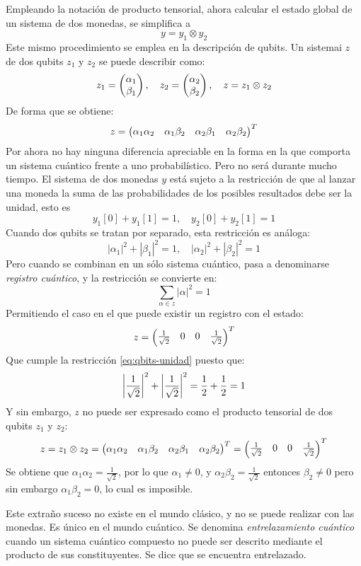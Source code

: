 Empleando la notación de producto tensorial, ahora calcular el estado global de 
un sistema de dos monedas, se simplifica a
%
$$ y = y_1 \otimes y_2 $$
%
Este mismo procedimiento se emplea en la descripción de qubits. Un sistemai $z$ 
de dos qubits $z_1$ y $z_2$ se puede describir como:
%
$$
z_1 = \begin{pmatrix} \alpha_1 \\ \beta_1 \end{pmatrix}, \quad
z_2 = \begin{pmatrix} \alpha_2 \\ \beta_2 \end{pmatrix}, \quad
z = z_1 \otimes z_2 $$
%
De forma que se obtiene:
%
$$
z = \begin{pmatrix} \alpha_1 \alpha_2 & \alpha_1 \beta_2
	& \alpha_2 \beta_1 & \alpha_2 \beta_2 \end{pmatrix}^T $$
%
Por ahora no hay ninguna diferencia apreciable en la forma en la que comporta un 
sistema cuántico frente a uno probabilístico. Pero no será durante mucho tiempo.
El sistema de dos monedas $y$ está sujeto a la restricción de que al lanzar una 
moneda la suma de las probabilidades de los posibles resultados debe ser la 
unidad, esto es
%
$$ y_1[0] + y_1[1] = 1, \quad y_2[0] + y_2[1] = 1$$
%
Cuando dos qubits se tratan por separado, esta restricción es análoga:
%
$$|\alpha_1|^2 + |\beta_1|^2 = 1, \quad |\alpha_2|^2 + |\beta_2|^2 = 1$$
%
Pero cuando se combinan en un sólo sistema cuántico, pasa a denominarse 
\textit{registro cuántico}, y la restricción se convierte en:
\begin{equation}
\label{eq:qbits-unidad}
\sum_{\alpha \in z} |\alpha|^2 = 1
\end{equation}
%
Permitiendo el caso en el que puede existir un registro con el estado:
$$ z = \begin{pmatrix} \frac{1}{\sqrt{2}} & 0 & 0 & \frac{1}{\sqrt{2}} \end{pmatrix}^T $$
Que cumple la restricción \eqref{eq:qbits-unidad} puesto que:
$$ \left|\frac{1}{\sqrt{2}}\right|^2 + \left|\frac{1}{\sqrt{2}}\right|^2 = \frac{1}{2} + 
\frac{1}{2} = 
1 $$
Y sin embargo, $z$ no puede ser expresado como el producto tensorial de dos 
qubits $z_1$ y $z_2$:
$$ z = z_1 \otimes z_2 = \begin{pmatrix} \alpha_1 \alpha_2 & \alpha_1 \beta_2
	& \alpha_2 \beta_1 & \alpha_2 \beta_2 \end{pmatrix}^T = \begin{pmatrix} \frac{1}{\sqrt{2}} & 0 & 
	0 & \frac{1}{\sqrt{2}} \end{pmatrix}^T
$$
Se obtiene que $\alpha_1 \alpha_2 = \frac{1}{\sqrt{2}}$, por lo que $\alpha_1 
\neq 0$, y $\alpha_2 \beta_2 = \frac{1}{\sqrt{2}}$ entonces $\beta_2 \neq 0$ 
pero sin embargo $\alpha_1 \beta_2 = 0$, lo cual es imposible.

Este extraño suceso no existe en el mundo clásico, y no se puede realizar con 
las monedas. Es único en el mundo cuántico. Se denomina \textit{entrelazamiento 
cuántico} cuando un sistema cuántico compuesto no puede ser descrito mediante el 
producto de sus constituyentes. Se dice que se encuentra entrelazado.


